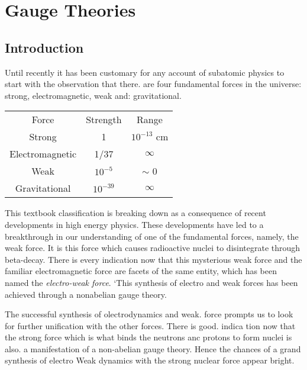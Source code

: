 \chapter{Gauge Theories}\label{chap24}


\authinfo{}

\section{Introduction}

Until recently it has been customary for any account of subatomic physics
to start with the observation that there. are four fundamental forces in the
universe: strong, electromagnetic, weak and: gravitational. 

\begin{center}
\begin{tabular}{ccc}
Force & Strength & Range\\[0.2cm]
Strong & 1 & $10^{-13}$ cm\\
Electromagnetic & 1/37 &$\infty$\\
Weak & $10^{-5}$ & $\sim$ 0\\
Gravitational & $10^{-39}$ & $\infty$\\
\end{tabular}
\end{center}

This textbook classification is breaking down as a consequence of
recent developments in high energy physics. These developments have led
to a breakthrough in our understanding of one of the fundamental forces,
namely, the weak force. It is this force which causes radioactive nuclei to 
disintegrate through beta-decay. There is every indication now that this
mysterious weak force and the familiar electromagnetic force are facets of
the same entity, which has been named the {\it electro-weak force}. ‘This
synthesis of electro and weak forces has been achieved through a nonabelian gauge theory. 

The successful synthesis of olectrodynamics and weak. force prompts us
to look for further unification with the other forces. There is good. indica
tion now that the strong force which is what binds the neutrons anc
protons to form nuclei is also. a manifestation of a non-abelian gauge
theory. Hence the chances of a grand synthesis of electro Weak dynamics
with the strong nuclear force appear bright. 

